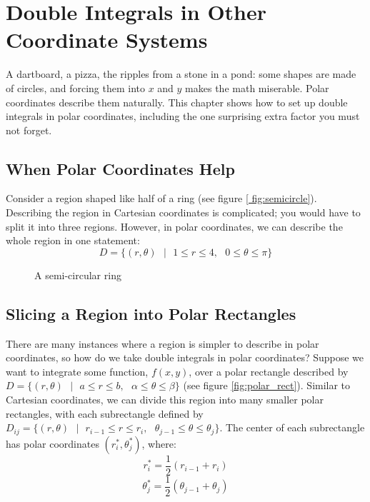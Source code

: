 \chapter{Double Integrals in Other Coordinate Systems}

A dartboard, a pizza, the ripples from a stone in a pond: some shapes are made
of circles, and forcing them into $x$ and $y$ makes the math miserable. Polar
coordinates describe them naturally. This chapter shows how to set up double
integrals in polar coordinates, including the one surprising extra factor you
must not forget.

\section{When Polar Coordinates Help}
Consider a region shaped like half of a ring (see figure \ref{
fig:semicircle}). Describing the region in Cartesian coordinates is 
complicated; you would have to split it into three regions. However, in polar coordinates, we can describe the whole region in one statement:
$$\textit{D} = \{(r, \theta)\text{ }|\text{ }1 \leq r \leq 4,\text{ }0 \leq 
\theta \leq \pi\}$$

\begin{figure}[H]
    \centering
    \caption{A semi-circular ring}
    \label{fig:semicircle}
\end{figure}

\section{Slicing a Region into Polar Rectangles}
There are many instances where a region is simpler to describe in polar 
coordinates, so how do we take double integrals in polar coordinates? Suppose 
we want to integrate some function, $f(x,y)$, over a polar rectangle described 
by $\textit{D} = \{(r, \theta)\text{ }|\text{ }a \leq r \leq b,\text{ }\alpha 
\leq \theta \leq \beta \}$ (see figure \ref{fig:polar_rect}). Similar to 
Cartesian coordinates, we can divide this region into many smaller polar 
rectangles, with each subrectangle defined by $\textit{D}_{ij} = \{(r, \theta)
\text{ }|\text{ }r_{i-1} \leq r \leq r_i,\text{ }\theta_{j - 1} \leq \theta 
\leq \theta_j\}$. The center of each subrectangle has polar coordinates $(
r_i^*, \theta_j^*)$, where:
$$r_i^* = \frac{1}{2} \left( r_{i - 1} + r_i \right)$$
$$\theta_j^* = \frac{1}{2} \left( \theta_{j - 1} + \theta_j \right)$$ 


